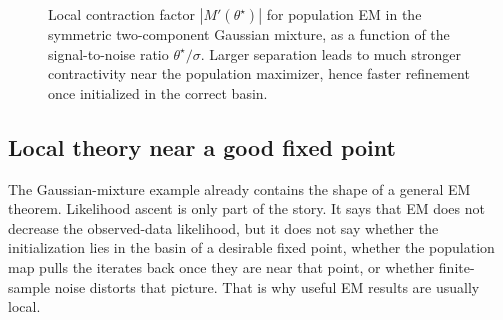 \documentclass[11pt]{article}
\newif\ifshowsolutions
\newcommand{\SolutionBox}[2][10]{%
  \ifshowsolutions
    \begin{tcolorbox}[stat221panelgray,title={Solution}]
    #2
    \end{tcolorbox}
  \else
    \begin{tcolorbox}[stat221panelgray,unbreakable,title={Workspace}]
    \vspace{#1\baselineskip}
    \end{tcolorbox}
  \fi
}
\begin{document}
\SolutionBox[22]{%
Starting from
\[
M'(\theta)
=
\E\!\left[\frac{Y^2}{\sigma^2}\cdot \frac{1}{\cosh^2\!\left(\frac{\theta Y}{\sigma^2}\right)}\right],
\]
use $\cosh(u)\ge \tfrac12 e^{|u|}$ to obtain $\cosh^{-2}(u)\le 4e^{-2|u|}$.
Hence,
\[
M'(\theta)
\le
\frac{4}{\sigma^2}\E\!\left[Y^2\exp\!\left(-\frac{2|\theta|\,|Y|}{\sigma^2}\right)\right].
\]
Fix $b>0$.  For $y\ge 0$, the function $y\mapsto y^2e^{-by}$ has derivative $e^{-by}(2y-by^2)$, so it is maximized at $y=2/b$ with value $4e^{-2}/b^2$.
Therefore $Y^2e^{-b|Y|}\le 4e^{-2}/b^2$ almost surely, and with $b=\frac{2|\theta|}{\sigma^2}$ we get
\[
M'(\theta)
\le
\frac{4}{\sigma^2}\cdot \frac{4e^{-2}}{b^2}
=
\frac{4e^{-2}\sigma^2}{\theta^2}.
\]
If $\theta^\star\ge \frac{4\sigma}{e}$ and $\theta\in[\theta^\star/2,3\theta^\star/2]$, then $|\theta|\ge \theta^\star/2$ and the bound gives
\[
\sup_{\theta\in[\theta^\star/2,3\theta^\star/2]} M'(\theta)
\le
\frac{16e^{-2}\sigma^2}{(\theta^\star)^2}
<1,
\]
so $M$ is a contraction on this interval with contraction factor $\kappa\le 16e^{-2}\sigma^2/(\theta^\star)^2$.%
}

\begin{figure}[t]
  \centering
  
  \caption{Local contraction factor $|M'(\theta^\star)|$ for population EM in the symmetric two-component Gaussian mixture, as a function of the signal-to-noise ratio $\theta^\star/\sigma$. Larger separation leads to much stronger contractivity near the population maximizer, hence faster refinement once initialized in the correct basin.}
  \label{fig:em-contraction-vs-snr}
\end{figure}

\subsection{Local theory near a good fixed point}
\label{subsec:em-population-contractivity-template}

The Gaussian-mixture example already contains the shape of a general EM theorem.
Likelihood ascent is only part of the story.
It says that EM does not decrease the observed-data likelihood, but it does not say whether the initialization lies in the basin of a desirable fixed point, whether the population map pulls the iterates back once they are near that point, or whether finite-sample noise distorts that picture.
That is why useful EM results are usually local.
\end{document}
